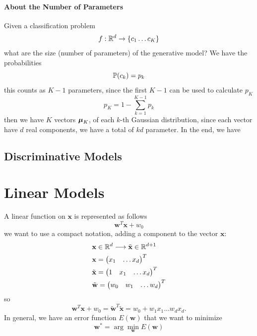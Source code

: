 \documentclass[10pt, letterpaper]{report}
\begin{document}
\subsubsection{About the Number of Parameters}
Given a classification problem$$f:{\mathbb R}^d\rightarrow\{c_1\dots c_K\}$$
what are the size (number of parameters) of the generative model? We have the probabilities$${\mathbb P}(c_k)=p_k $$ this counts as $K-1$ parameters, since the first $K-1$ can be used to calculate $p_K$\begin{equation}
    p_K=1-\sum_{k=1}^{K-1}p_k
\end{equation}
then we have $K$ vectors ${\boldsymbol{\mu}}_K$, of each $k$-th Gaussian distribution, since each vector have $d$ real components, we have a total of $kd$ parameter. In the end, we have 
\section{Discriminative Models}
\chapter{Linear Models}
A linear function on $\mathbf x$ is represented as follows\begin{equation}
    \mathbf w^T\mathbf x+w_0
\end{equation}
we want to use a compact notation, adding a component to the vector $\mathbf x$:\begin{align}
    &\mathbf x \in {\mathbb R}^d\longrightarrow \tilde{\mathbf x}\in {\mathbb R}^{d+1}\\
    &\mathbf x=\begin{pmatrix}
        x_1&\dots x_d
    \end{pmatrix}^T\\
    &\tilde{\mathbf x}=\begin{pmatrix}
        1&x_1&\dots x_d
    \end{pmatrix}^T\\
    &\tilde{\mathbf w}=\begin{pmatrix}
        w_0&w_1&\dots w_d
    \end{pmatrix}^T
\end{align}
so\begin{equation}
    \mathbf w^T\mathbf x +w_0=\tilde{\mathbf w}^T\tilde{\mathbf x}=w_0+w_1x_1\dots w_dx_d.
\end{equation}
In general, we have an error function $E(\mathbf w)$ that we want to minimize\begin{equation}
    \mathbf w^*=\arg\min_{\mathbf w}E(\mathbf w)
\end{equation} 
\end{document}
